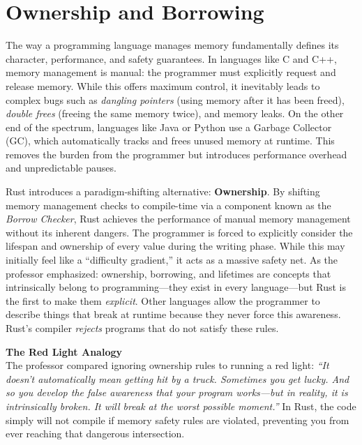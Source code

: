 \chapter{Ownership and Borrowing}

The way a programming language manages memory fundamentally defines its character, performance, and safety guarantees. In languages like C and C++, memory management is manual: the programmer must explicitly request and release memory. While this offers maximum control, it inevitably leads to complex bugs such as \emph{dangling pointers} (using memory after it has been freed), \emph{double frees} (freeing the same memory twice), and memory leaks. On the other end of the spectrum, languages like Java or Python use a Garbage Collector (GC), which automatically tracks and frees unused memory at runtime. This removes the burden from the programmer but introduces performance overhead and unpredictable pauses.

Rust introduces a paradigm-shifting alternative: \textbf{Ownership}. By shifting memory management checks to compile-time via a component known as the \emph{Borrow Checker}, Rust achieves the performance of manual memory management without its inherent dangers. The programmer is forced to explicitly consider the lifespan and ownership of every value during the writing phase. While this may initially feel like a ``difficulty gradient,'' it acts as a massive safety net. As the professor emphasized: ownership, borrowing, and lifetimes are concepts that intrinsically belong to programming---they exist in every language---but Rust is the first to make them \emph{explicit}. Other languages allow the programmer to describe things that break at runtime because they never force this awareness. Rust's compiler \emph{rejects} programs that do not satisfy these rules.

\begin{insightbox}
\textbf{The Red Light Analogy} \\
The professor compared ignoring ownership rules to running a red light: \emph{``It doesn't automatically mean getting hit by a truck. Sometimes you get lucky. And so you develop the false awareness that your program works---but in reality, it is intrinsically broken. It will break at the worst possible moment.''}  In Rust, the code simply will not compile if memory safety rules are violated, preventing you from ever reaching that dangerous intersection.
\end{insightbox}


